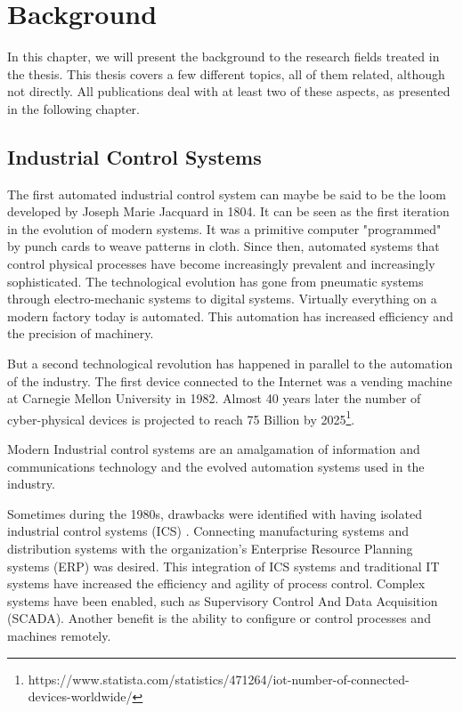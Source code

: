 \chapter{Background}
\label{ch:background}
In this chapter, we will present the background to the research fields treated in the thesis. 
This thesis covers a few different topics, all of them related, although not directly. All publications deal with at least two of these aspects, as presented in the following chapter.

\section{Industrial Control Systems}
\label{sec:cps}
The first automated industrial control system can maybe be said to be the loom developed by Joseph Marie Jacquard in 1804. It can be seen as the first iteration in the evolution of modern systems. It was a primitive computer "programmed" by punch cards to weave patterns in cloth. Since then, automated systems that control physical processes have become increasingly prevalent and increasingly sophisticated. The technological evolution has gone from pneumatic systems through electro-mechanic systems to digital systems.
Virtually everything on a modern factory today is automated. This automation has increased efficiency and the precision of machinery.

But a second technological revolution has happened in parallel to the automation of the industry.
The first device connected to the Internet was a vending machine at Carnegie Mellon University in 1982. Almost 40 years later the number of cyber-physical devices is projected to reach 75 Billion by 2025\footnote{https://www.statista.com/statistics/471264/iot-number-of-connected-
devices-worldwide/}. 

Modern Industrial control systems are an amalgamation of information and communications technology and the evolved automation systems used in the industry. 

Sometimes during the 1980s, drawbacks were identified with having isolated industrial control systems (ICS) \cite{wollschlaeger2017future}. Connecting manufacturing systems and distribution systems with the organization's Enterprise Resource Planning systems (ERP) was desired. This integration of ICS systems and traditional IT systems have increased the efficiency and agility of process control. Complex systems have been enabled, such as Supervisory Control And Data Acquisition (SCADA). Another benefit is the ability to configure or control processes and machines remotely.


